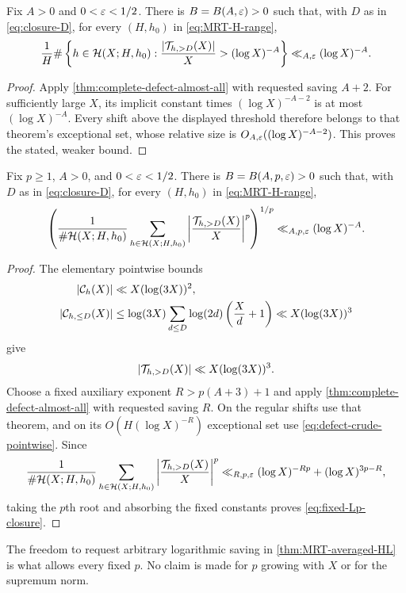 \begin{corollary}
\label{cor:shift-density-convergence}
Fix $A>0$ and $0<\varepsilon<1/2$.  There is $B=B(A,\varepsilon)>0$ such that, with
$D$ as in \eqref{eq:closure-D}, for every $(H,h_0)$ in
\eqref{eq:MRT-H-range},
\begin{equation}\label{eq:density-tail-bound}
 \frac1H\#\left\{h\in\mathcal H(X;H,h_0):
 \frac{|\mathcal T_{h,>D}(X)|}{X}>(\log X)^{-A}\right\}
 \ll_{A,\varepsilon}(\log X)^{-A}.
\end{equation}
\end{corollary}

\begin{proof}
Apply \cref{thm:complete-defect-almost-all} with requested saving $A+2$.
For sufficiently large $X$, its implicit constant times
$(\log X)^{-A-2}$ is at most $(\log X)^{-A}$.  Every shift above the displayed
threshold therefore belongs to that theorem's exceptional set, whose
relative size is $O_{A,\varepsilon}((\log X)^{-A-2})$.  This proves the stated,
weaker bound.
\end{proof}

\begin{corollary}
\label{cor:fixed-Lp-closure}
Fix $p\ge1$, $A>0$, and $0<\varepsilon<1/2$.  There is
$B=B(A,p,\varepsilon)>0$ such that, with $D$ as in \eqref{eq:closure-D}, for every
$(H,h_0)$ in \eqref{eq:MRT-H-range},
\begin{equation}\label{eq:fixed-Lp-closure}
 \left(
  \frac1{\#\mathcal H(X;H,h_0)}
  \sum_{h\in\mathcal H(X;H,h_0)}
  \left|\frac{\mathcal T_{h,>D}(X)}X\right|^p
 \right)^{1/p}
 \ll_{A,p,\varepsilon}(\log X)^{-A}.
\end{equation}
\end{corollary}

\begin{proof}
The elementary pointwise bounds
\begin{align*}
 |\mathcal C_h(X)|&\ll X(\log(3X))^2,\\
 |\mathcal C_{h,\le D}(X)|
 &\le \log(3X)
 \sum_{d\le D}\log(2d)\left(\frac Xd+1\right)
 \ll X(\log(3X))^3
\end{align*}
give
\begin{equation}\label{eq:defect-crude-pointwise}
 |\mathcal T_{h,>D}(X)|\ll X(\log(3X))^3.
\end{equation}
Choose a fixed auxiliary exponent $R>p(A+3)+1$ and apply
\cref{thm:complete-defect-almost-all} with requested saving $R$.  On the
regular shifts use that theorem, and on its $O(H(\log X)^{-R})$ exceptional
set use \eqref{eq:defect-crude-pointwise}.  Since
\[
 \frac1{\#\mathcal H(X;H,h_0)}
 \sum_{h\in\mathcal H(X;H,h_0)}
 \left|\frac{\mathcal T_{h,>D}(X)}X\right|^p
 \ll_{R,p,\varepsilon}(\log X)^{-Rp}+(\log X)^{3p-R},
\]
taking the $p$th root and absorbing the fixed constants proves
\eqref{eq:fixed-Lp-closure}.
\end{proof}

The freedom to request arbitrary logarithmic saving in
\cref{thm:MRT-averaged-HL} is what allows every fixed $p$.  No claim is made
for $p$ growing with $X$ or for the supremum norm.

